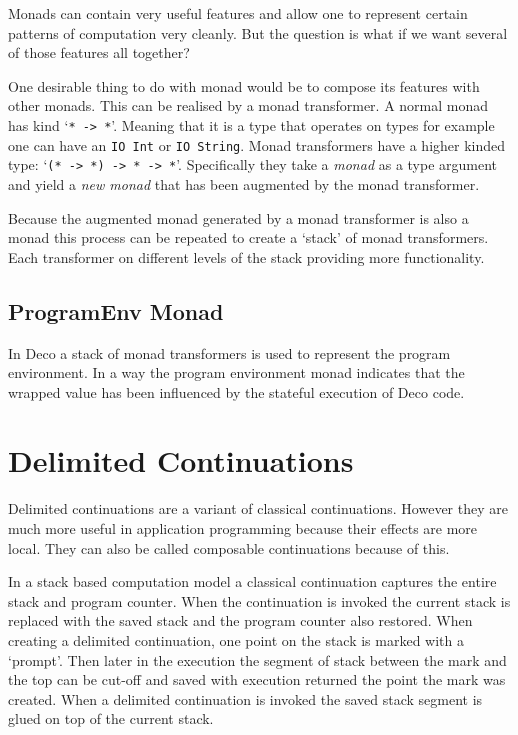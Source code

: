 \documentclass[]{article}
\newcommand{\type}[1]{\texttt{#1}}
\begin{document}
Monads can contain very useful features and allow one to represent
certain patterns of computation very cleanly. But the question is
what if we want several of those features all together?

One desirable thing to do with monad would be to compose its features with
other monads. This can be realised by a monad transformer. A normal monad has
kind `\type{* -> *}'. Meaning that it is a type that operates on types for
example one can have an \type{IO Int} or \type{IO String}. Monad transformers
have a higher kinded type: `\type{(* -> *) -> * -> *}'. Specifically they take
a \emph{monad} as a type argument and yield a \emph{new monad} that has
been augmented by the monad transformer.

Because the augmented monad generated by a monad transformer is also a monad
this process can be repeated to create a `stack' of monad transformers. Each
transformer on different levels of the stack providing more functionality.

\subsection{ProgramEnv Monad}

In Deco a stack of monad transformers is used to represent the program
environment. In a way the program environment monad indicates that the
wrapped value has been influenced by the stateful execution of Deco code.

\section{Delimited Continuations}
\label{discussion:delcont}

Delimited continuations are a variant of classical continuations. However they
are much more useful in application programming because their effects are more
local. They can also be called composable continuations because of this.

In a stack based computation model a classical continuation captures the
entire stack and program counter. When the continuation is invoked the current
stack is replaced with the saved stack and the program counter also restored.
When creating a delimited continuation, one point on the stack is marked with
a `prompt'. Then later in the execution the segment of stack between the mark
and the top can be cut-off and saved with execution returned the point the
mark was created. When a delimited continuation is invoked the saved
stack segment is glued on top of the current stack.
\end{document}
